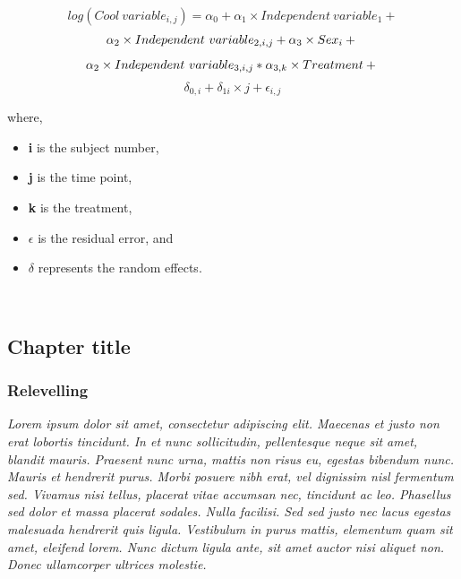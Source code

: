 \documentclass[]{elsarticle} %
\providecommand{\tightlist}{%
  \setlength{\itemsep}{0pt}\setlength{\parskip}{0pt}}
\begin{document}
\(~\)\\

\[
  log(Cool\ variable_{i,j}) = \alpha_0 + 
  \alpha_1\times Independent\ variable_1 +
\] \[
  \alpha_2\times Independent\ variable_{2,i,j} +
  \alpha_3\times Sex_i + \\
\] \[
  \alpha_2\times Independent\ variable_{3,i,j} *
  \alpha_{3,k} \times Treatment + \\ 
\] \[
  \delta_{0,i}+\delta_{1i}\times j+\epsilon_{i,j}
\]

where,

\begin{itemize}
\tightlist
\item
  \textbf{i} is the subject number,\\
\item
  \textbf{j} is the time point,\\
\item
  \textbf{k} is the treatment,\\
\item
  \(\epsilon\) is the residual error, and\\
\item
  \(\delta\) represents the random effects.
\end{itemize}

\(~\)\\

\hypertarget{chapter-title}{%
\subsection{Chapter title}\label{chapter-title}}

\hypertarget{relevelling}{%
\subsubsection{Relevelling}\label{relevelling}}

\emph{Lorem ipsum dolor sit amet, consectetur adipiscing elit. Maecenas
et justo non erat lobortis tincidunt. In et nunc sollicitudin,
pellentesque neque sit amet, blandit mauris. Praesent nunc urna, mattis
non risus eu, egestas bibendum nunc. Mauris et hendrerit purus. Morbi
posuere nibh erat, vel dignissim nisl fermentum sed. Vivamus nisi
tellus, placerat vitae accumsan nec, tincidunt ac leo. Phasellus sed
dolor et massa placerat sodales. Nulla facilisi. Sed sed justo nec lacus
egestas malesuada hendrerit quis ligula. Vestibulum in purus mattis,
elementum quam sit amet, eleifend lorem. Nunc dictum ligula ante, sit
amet auctor nisi aliquet non. Donec ullamcorper ultrices molestie.}
\end{document}
